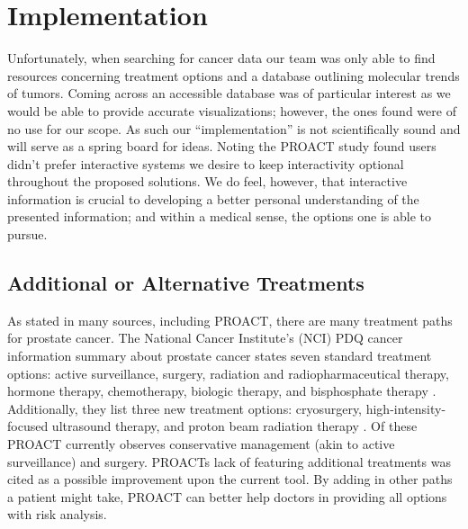 \documentclass[journal]{vgtc}                %
\begin{document}
\section{Implementation}
        Unfortunately, when searching for cancer data our team was only able to find resources concerning treatment options and a database outlining molecular trends of tumors.
        Coming across an accessible database was of particular interest as we would be able to provide accurate visualizations; however, the ones found were of no use for our scope.
        As such our ``implementation'' is not scientifically sound and will serve as a spring board for ideas.
        Noting the PROACT study found users didn't prefer interactive systems we desire to keep interactivity optional throughout the proposed solutions.
        We do feel, however, that interactive information is crucial to developing a better personal understanding of the presented information; and within a medical sense, the options one is able to pursue.

        \subsection{Additional or Alternative Treatments}
                As stated in many sources, including PROACT, there are many treatment paths for prostate cancer.
                The National Cancer Institute's (NCI) PDQ cancer information summary about prostate cancer states seven standard treatment options: active surveillance, surgery, radiation and radiopharmaceutical therapy, hormone therapy, chemotherapy, biologic therapy, and bisphosphate therapy \cite{PDQProstateCancer:2016}.
                Additionally, they list three new treatment options: cryosurgery, high-intensity-focused ultrasound therapy, and proton beam radiation therapy \cite{PDQProstateCancer:2016}.
                Of these PROACT currently observes conservative management (akin to active surveillance) and surgery.
                PROACTs lack of featuring additional treatments was cited as a possible improvement upon the current tool.
                By adding in other paths a patient might take, PROACT can better help doctors in providing all options with risk analysis.
\end{document}
